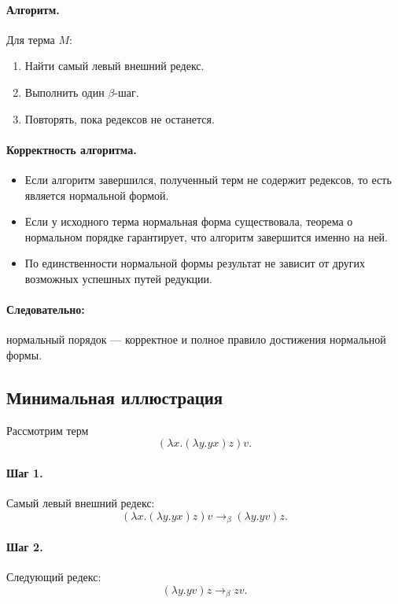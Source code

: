 \documentclass[12pt,a4paper]{article}
\theoremstyle{remark}
\begin{document}
\paragraph{Алгоритм.}
Для терма $M$:
\begin{enumerate}
    \item Найти самый левый внешний редекс.
    \item Выполнить один $\beta$-шаг.
    \item Повторять, пока редексов не останется.
\end{enumerate}

\paragraph{Корректность алгоритма.}
\begin{itemize}
    \item Если алгоритм завершился, полученный терм не содержит редексов, то есть является нормальной формой.
    \item Если у исходного терма нормальная форма существовала, теорема о нормальном порядке гарантирует, что алгоритм завершится именно на ней.
    \item По единственности нормальной формы результат не зависит от других возможных успешных путей редукции.
\end{itemize}

\paragraph{Следовательно:}
нормальный порядок --- корректное и полное правило достижения нормальной формы.

\subsection{Минимальная иллюстрация}

Рассмотрим терм
\[
(\lambda x.(\lambda y.yx)z)v.
\]

\paragraph{Шаг 1.}
Самый левый внешний редекс:
\[
(\lambda x.(\lambda y.yx)z)v \to_\beta (\lambda y.yv)z.
\]

\paragraph{Шаг 2.}
Следующий редекс:
\[
(\lambda y.yv)z \to_\beta zv.
\]
\end{document}
